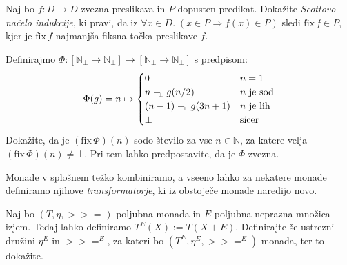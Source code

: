 \documentclass[arhiv]{../izpit}
\begin{document}
\podnaloga[\tocke{10}]
Naj bo $f : D \to D$ zvezna preslikava in $P$ dopusten predikat.
Dokažite \emph{Scottovo načelo indukcije}, ki pravi, da iz $\forall x
\in D.\; (x \in P \Rightarrow f(x) \in P)$ sledi $\mathrm{fix} \, f
\in P$, kjer je $\mathrm{fix} \, f$ najmanjša fiksna točka preslikave
$f$.

\podnaloga[\tocke{10}]
Definirajmo $\Phi : [\mathbb{N}_\bot \to \mathbb{N}_\bot] \to [\mathbb{N}_\bot \to \mathbb{N}_\bot]$ s predpisom:
\[
  \Phi(g) = n \mapsto \begin{cases}
    0       & n = 1 \\
    n \mathrel{+_{\!\!\scriptscriptstyle \bot}} g(n/2)  & \text{$n$ je sod} \\
    (n - 1) \mathrel{+_{\!\!\scriptscriptstyle \bot}} g(3n + 1) & \text{$n$ je lih} \\
    \bot    & \text{sicer} \\
  \end{cases}
\]
Dokažite, da je $(\mathrm{fix} \, \Phi)(n)$ sodo število za vse $n \in
\mathbb{N}$, za katere velja $(\mathrm{fix} \, \Phi)(n) \neq \bot$.
Pri tem lahko predpostavite, da je $\Phi$ zvezna.

\nadaljevanje


\naloga[\tocke{20}]

\newcommand{\TE}{T^{\!E}}
\newcommand{\bind}[1]{\mathbin{>\!\!\!>\!\!\!=}_{#1}}
\newcommand{\bindE}[1]{\mathbin{>\!\!\!>\!\!\!=^{\!E}_{#1}}}

Monade v splošnem težko kombiniramo, a vseeno lahko za nekatere monade
definiramo njihove \emph{transformatorje}, ki iz obstoječe monade
naredijo novo.

Naj bo $(T, \eta, \bind{})$ poljubna monada in $E$ poljubna neprazna
množica izjem. Tedaj lahko definiramo $\TE(X) := T(X + E)$.
Definirajte še ustrezni družini $\eta^E$ in $\bindE{}$, za kateri bo
$(\TE, \eta^E, \bindE{})$ monada, ter to dokažite.

\nadaljevanje
\end{document}
